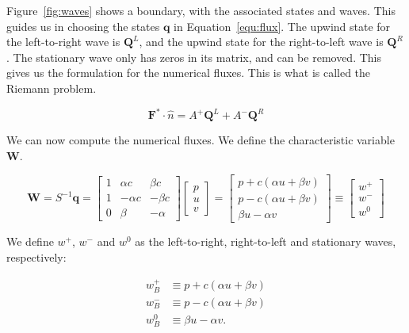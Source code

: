 Figure~\ref{fig:waves} shows a boundary, with the associated states and waves. This guides us in
choosing the states $\mathbf{q}$ in Equation~\ref{equ:flux}. The upwind state for the
left-to-right wave is $\mathbf{Q}^L$, and the upwind state for the right-to-left wave is
$\mathbf{Q}^R$. The stationary wave only has zeros in its matrix, and can be removed. This gives us
the formulation for the numerical fluxes. This is what is called the Riemann problem.

\begin{equation} \label{equ:flux_states}
	\mathbf{F}^* \cdot \widehat{n} = A^+ \mathbf{Q}^L + A^- \mathbf{Q}^R
\end{equation}

We can now compute the numerical fluxes. We define the characteristic variable $\mathbf{W}$.

\begin{equation}
	\mathbf{W} = S^{-1} \mathbf{q} = 
    \begin{bmatrix}
        1 & \alpha c & \beta c \\ 
        1 & -\alpha c & -\beta c \\ 
        0 & \beta & -\alpha
	\end{bmatrix}
	\begin{bmatrix}
        p \\ 
        u \\ 
        v
	\end{bmatrix} = 
	\begin{bmatrix}
        p + c \left( \alpha u + \beta v \right) \\ 
        p - c \left( \alpha u + \beta v \right) \\ 
        \beta u - \alpha v
	\end{bmatrix} \equiv
    \begin{bmatrix}
        w^+ \\
        w^- \\
        w^0
    \end{bmatrix}   
\end{equation}

We define $w^+$, $w^-$ and $w^0$ as the left-to-right, right-to-left and stationary waves,
respectively:

\begin{equation} \label{equ:waves_x}
	\begin{split}
        w_B^+ & \equiv p + c \left( \alpha u + \beta v \right) \\
        w_B^- & \equiv p - c \left( \alpha u + \beta v \right) \\
        w_B^0 & \equiv \beta u - \alpha v.
	\end{split} 
\end{equation}

